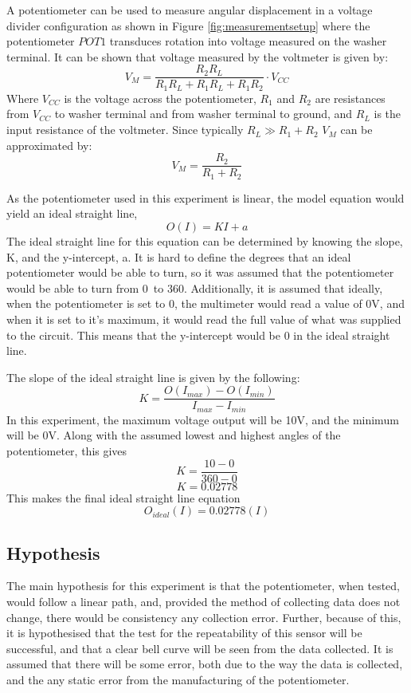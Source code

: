\documentclass[a4,11pt]{article}
\begin{document}
A potentiometer can be used to  measure angular displacement in a
voltage divider configuration as shown in Figure \ref{fig:measurementsetup} where the potentiometer $POT1$ transduces rotation into voltage measured on the
washer terminal. It can be shown that voltage measured by the voltmeter is given by:
$$V_{M}=\frac{R_2R_L}{R_1R_L+R_1R_L+R_1R_2}\cdot V_{CC}$$
Where $V_{CC}$ is the voltage across the potentiometer, $R_1$ and $R_2$ are resistances from $V_{CC}$ to washer terminal and from washer terminal to ground, and $R_L$ is the input resistance of the voltmeter. Since typically $R_L\gg R_1+R_2$ $V_M$ can be approximated by:
$$V_{M}=\frac{R_2}{R_1+R_2}$$

As the potentiometer used in this experiment is linear, the model equation would yield an ideal straight line,
$$O(I)=KI+a$$
The ideal straight line for this equation can be determined by knowing the slope, K, and the y-intercept, a. It is hard to define the degrees that an ideal potentiometer would be able to turn, so it was assumed that the potentiometer would be able to turn from 0\degree\ to 360\degree. Additionally, it is assumed that ideally, when the potentiometer is set to 0\degree, the multimeter would read a value of 0V, and when it is set to it's maximum, it would read the full value of what was supplied to the circuit. This means that the y-intercept would be 0 in the ideal straight line.

The slope of the ideal straight line is given by the following:
$$K=\frac{O(I_{max})-O(I_{min})}{I_{max}-I_{min}}$$
In this experiment, the maximum voltage output will be 10V, and the minimum will be 0V. Along with the assumed lowest and highest angles of the potentiometer, this gives
$$K=\frac{10-0}{360-0}$$
$$K=0.02778$$
This makes the final ideal straight line equation
$$O_{ideal}(I)=0.02778(I)$$
\subsection{Hypothesis}
The main hypothesis for this experiment is that the potentiometer, when tested, would follow a linear path, and, provided the method of collecting data does not change, there would be consistency any collection error. Further, because of this, it is hypothesised that the test for the repeatability of this sensor will be successful, and that a clear bell curve will be seen from the data collected. It is assumed that there will be some error, both due to the way the data is collected, and the any static error from the manufacturing of the potentiometer.
\end{document}
